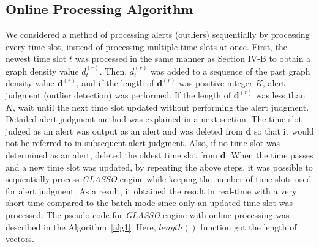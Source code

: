 \documentclass[conference]{IEEEtran}
\begin{document}
\subsection{Online Processing Algorithm}
We considered a method of processing alerts (outliers) sequentially by processing every time slot, instead of processing multiple time slots at once.
First, the newest time slot $t$ was processed in the same manner as Section I\hspace{-.1em}V-B to obtain a graph density value $d_t^{(r)}$.
Then, $d_t^{(r)}$ was added to a sequence of the past graph density value $\bm{d}^{(r)}$, and if the length of $\bm{d}^{(r)}$ was positive integer $K$, alert judgment (outlier detection) was performed.
If the length of $\bm{d}^{(r)}$ was less than $K$, wait until the next time slot updated without performing the alert judgment.
Detailed alert judgment method was explained in a next section.
The time slot judged as an alert was output as an alert and was deleted from $\bm{d}$ so that it would not be referred to in subsequent alert judgment.
Also, if no time slot was determined as an alert, deleted the oldest time slot from $\bm{d}$.
When the time passes and a new time slot was updated, by repeating the above steps, it was possible to sequentially process {\it GLASSO} engine while keeping the number of time slots used for alert judgment.
As a result, it obtained the result in real-time with a very short time compared to the batch-mode since only an updated time slot was processed.
The pseudo code for {\it GLASSO} engine with online processing was described in the Algorithm~\ref{alg1}.
Here, $length()$ function got the length of vectors.


\end{document}
